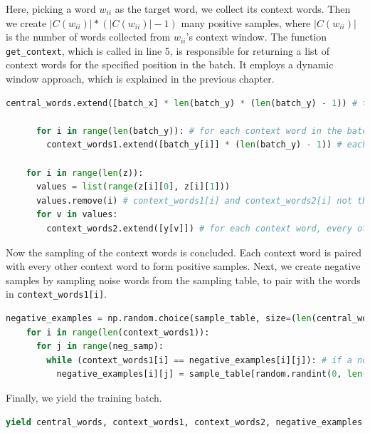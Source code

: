 Here, picking a word $w_{ii}$ as the target word, we collect its context words. Then we create $|C(w_{ii})| * (|C(w_{ii})| - 1)$ many positive samples, where $|C(w_{ii})|$ is the number of words collected from $w_{ii}$'s context window. The function \verb|get_context|, which is called in line 5, is responsible for returning a list of context words for the specified position in the batch. It employs a dynamic window approach, which is explained in the previous chapter.

\begin{lstlisting}[language=Python, caption=Batch generating function - Part 4]
      central_words.extend([batch_x] * len(batch_y) * (len(batch_y) - 1)) # target word repeated by 2 comb of context words in batch

      for i in range(len(batch_y)): # for each context word in the batch
        context_words1.extend([batch_y[i]] * (len(batch_y) - 1)) # each context word, by number of context words

    for i in range(len(z)):
      values = list(range(z[i][0], z[i][1]))
      values.remove(i) # context_words1[i] and context_words2[i] not the same
      for v in values:
        context_words2.extend([y[v]]) # for each context word, every other context word
\end{lstlisting}

Now the sampling of the context words is concluded. Each context word is paired with every other context word to form positive samples. Next, we create negative samples by sampling noise words from the sampling table, to pair with the words in \verb|context_words1[i]|.

\begin{lstlisting}[language=Python, caption=Batch generating function - Part 5]
    negative_examples = np.random.choice(sample_table, size=(len(central_words), neg_samp))  # list of negative samples for each context word
    for i in range(len(context_words1)):
      for j in range(neg_samp):
        while (context_words1[i] == negative_examples[i][j]): # if a noise word is the same with the context
          negative_examples[i][j] = sample_table[random.randint(0, len(sample_table))] # force it to be different than corresponding context sample
\end{lstlisting}

Finally, we yield the training batch.

\begin{lstlisting}[language=Python, caption=Batch generating function - Part 6]
    yield central_words, context_words1, context_words2, negative_examples
\end{lstlisting}

